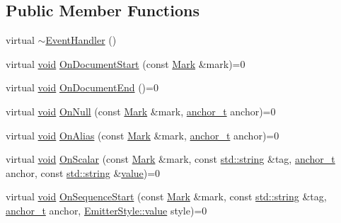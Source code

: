 \subsection*{Public Member Functions}
\begin{DoxyCompactItemize}
\item 
virtual \mbox{\hyperlink{class_y_a_m_l_1_1_event_handler_a4be5c33c3f362dd80d56475acff1268a}{$\sim$\+Event\+Handler}} ()
\item 
virtual \mbox{\hyperlink{glad_8h_a950fc91edb4504f62f1c577bf4727c29}{void}} \mbox{\hyperlink{class_y_a_m_l_1_1_event_handler_adb739beb59e227bd320aab1e61bf42e4}{On\+Document\+Start}} (const \mbox{\hyperlink{struct_y_a_m_l_1_1_mark}{Mark}} \&mark)=0
\item 
virtual \mbox{\hyperlink{glad_8h_a950fc91edb4504f62f1c577bf4727c29}{void}} \mbox{\hyperlink{class_y_a_m_l_1_1_event_handler_afc0d547e87f9c1f63ba8087aabd7e34a}{On\+Document\+End}} ()=0
\item 
virtual \mbox{\hyperlink{glad_8h_a950fc91edb4504f62f1c577bf4727c29}{void}} \mbox{\hyperlink{class_y_a_m_l_1_1_event_handler_aca632ae43f71b6c4f13252d15191f380}{On\+Null}} (const \mbox{\hyperlink{struct_y_a_m_l_1_1_mark}{Mark}} \&mark, \mbox{\hyperlink{namespace_y_a_m_l_abeff1798814ae3402fc5665fdcad1de6}{anchor\+\_\+t}} anchor)=0
\item 
virtual \mbox{\hyperlink{glad_8h_a950fc91edb4504f62f1c577bf4727c29}{void}} \mbox{\hyperlink{class_y_a_m_l_1_1_event_handler_a3459009c2aad49b3226e009fc06d33b6}{On\+Alias}} (const \mbox{\hyperlink{struct_y_a_m_l_1_1_mark}{Mark}} \&mark, \mbox{\hyperlink{namespace_y_a_m_l_abeff1798814ae3402fc5665fdcad1de6}{anchor\+\_\+t}} anchor)=0
\item 
virtual \mbox{\hyperlink{glad_8h_a950fc91edb4504f62f1c577bf4727c29}{void}} \mbox{\hyperlink{class_y_a_m_l_1_1_event_handler_a1f381a132754352eee6b8dcd218e3abc}{On\+Scalar}} (const \mbox{\hyperlink{struct_y_a_m_l_1_1_mark}{Mark}} \&mark, const \mbox{\hyperlink{glad_8h_ac83513893df92266f79a515488701770}{std\+::string}} \&tag, \mbox{\hyperlink{namespace_y_a_m_l_abeff1798814ae3402fc5665fdcad1de6}{anchor\+\_\+t}} anchor, const \mbox{\hyperlink{glad_8h_ac83513893df92266f79a515488701770}{std\+::string}} \&\mbox{\hyperlink{glad_8h_a03aff08f73d7fde3d1a08e0abd8e84fa}{value}})=0
\item 
virtual \mbox{\hyperlink{glad_8h_a950fc91edb4504f62f1c577bf4727c29}{void}} \mbox{\hyperlink{class_y_a_m_l_1_1_event_handler_adf7a5e4ccf638b656009525556412ab5}{On\+Sequence\+Start}} (const \mbox{\hyperlink{struct_y_a_m_l_1_1_mark}{Mark}} \&mark, const \mbox{\hyperlink{glad_8h_ac83513893df92266f79a515488701770}{std\+::string}} \&tag, \mbox{\hyperlink{namespace_y_a_m_l_abeff1798814ae3402fc5665fdcad1de6}{anchor\+\_\+t}} anchor, \mbox{\hyperlink{struct_y_a_m_l_1_1_emitter_style_ae86640662c85ce6062a37f9636b6959f}{Emitter\+Style\+::value}} style)=0

\end{DoxyCompactItemize}
